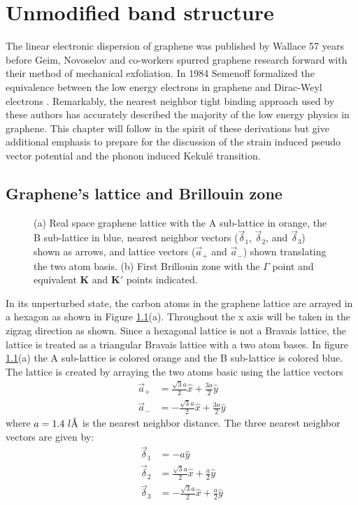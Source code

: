 \chapter{Unmodified band structure\label{chap:TB}}

The linear electronic dispersion of graphene was published by Wallace\cite{Wallace1947} 57 years before Geim, Novoselov and co-workers spurred graphene research forward with their method of mechanical exfoliation\cite{Novoselov2004}.
In 1984 Semenoff formalized the equivalence between the low energy electrons in graphene and Dirac-Weyl electrons \cite{Semenoff1984}.
Remarkably, the nearest neighbor tight binding approach used by these authors has accurately described the majority of the low energy physics in graphene.
This chapter will follow in the spirit of these derivations but give additional emphasis to prepare for the discussion of the strain induced pseudo vector potential and the phonon induced Kekul\'e transition.

\section{Graphene's lattice and Brillouin zone}
\begin{figure}
	\begin{center}
	
	\end{center}
	\caption{\label{fig:TB:geometry} (a) Real space graphene lattice with the A sub-lattice in orange, the B sub-lattice in blue, nearest neighbor vectors ($\vec \delta_1$, $\vec \delta_2$, and $\vec \delta_3$) shown as arrows, and lattice vectors ($\vec a_+$ and $\vec a_-$) shown translating the two atom basis. (b) First Brillouin zone with the $\Gamma$ point and equivalent $\bm{K}$ and $\bm{K'}$ points indicated.}
\end{figure}

In its unperturbed state, the carbon atoms in the graphene lattice are arrayed in a hexagon as shown in Figure \ref{fig:TB:geometry}(a).
Throughout the x axis will be taken in the zigzag direction as shown.
Since a hexagonal lattice is not a Bravais lattice, the lattice is treated as a triangular Bravais lattice with a two atom bases.
In figure \ref{fig:TB:geometry}(a) the A sub-lattice is colored orange and the B sub-lattice is colored blue.
The lattice is created by arraying the two atoms basic using the lattice vectors 
\begin{align*}
	\vec{a}_+&= \frac{\sqrt{3}a}{2} \hat{x} + \frac{3a}{2} \hat{y} \\
	\vec{a}_-&=-\frac{\sqrt{3}a}{2} \hat{x} + \frac{3a}{2} \hat{y}
\end{align*}
where $a=1.4 \ l\textup{\AA}$ is the nearest neighbor distance.
The three nearest neighbor vectors are given by:
\begin{align*}
	\vec \delta_1&=-a \hat{y} \\
	\vec \delta_2&= \frac{\sqrt{3} a}{2}\hat{x}+\frac{a}{2}\hat{y}\\
	\vec \delta_3&=-\frac{\sqrt{3} a}{2}\hat{x}+\frac{a}{2}\hat{y}\\
\end{align*}

